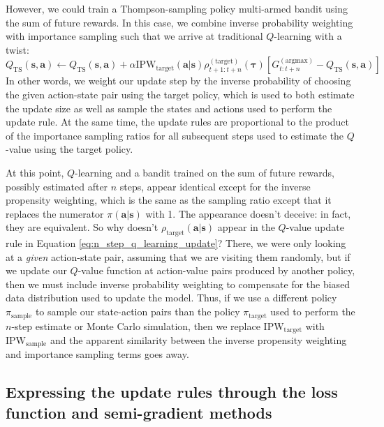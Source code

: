 \documentclass{article}
\begin{document}
However, we could train a Thompson-sampling policy multi-armed bandit using the sum of future rewards. In this case, we combine inverse probability weighting with importance sampling such that we arrive at traditional $Q$-learning with a twist:
\begin{equation}\label{eq:n_step_q_learning_update}
Q_\text{TS}(\mathbf{s},\mathbf{a})\leftarrow Q_\text{TS}(\mathbf{s},\mathbf{a})+\alpha\text{IPW}_\text{target}( \mathbf{a}|\mathbf{s})\rho^{(\text{target})}_{ t+1:t+n}(\boldsymbol{\tau})\left[G_{t:t+n}^{(\text{argmax})}-Q_\text{TS}(\mathbf{s},\mathbf{a})\right]\end{equation}In other words, we weight our update step by the inverse probability of choosing the given action-state pair using the target policy, which is used to both estimate the update size as well as sample the states and actions used to perform the update rule. At the same time, the update rules are proportional to the product of the importance sampling ratios for all subsequent steps used to estimate the $Q$-value using the target policy. 

At this point, $Q$-learning and a bandit trained on the sum of future rewards, possibly estimated after $n$ steps, appear identical except for the inverse propensity weighting, which is the same as the sampling ratio except that it replaces the numerator $\pi(\mathbf{a}|\mathbf{s})$ with 1. The appearance doesn't deceive: in fact, they are equivalent. So why doesn't $\rho_\text{target}(\mathbf{a}|\mathbf{s})$ appear in the $Q$-value update rule in Equation \ref{eq:n_step_q_learning_update}? There, we were only looking at a \textit{given} action-state pair, assuming that we are visiting them randomly, but if we update our $Q$-value function at action-value pairs produced by another policy, then we must include inverse probability weighting to compensate for the biased data distribution used to update the model. Thus, if we use a different policy $\pi_\text{sample}$ to sample our state-action pairs than the policy $\pi_\text{target}$ used to perform the $n$-step estimate or Monte Carlo simulation, then we replace $\text{IPW}_{\text{target}}$ with $\text{IPW}_{\text{sample}}$ and the apparent similarity between the inverse propensity weighting and importance sampling terms goes away.

\subsection{Expressing the update rules through the loss function and semi-gradient methods}
\end{document}
